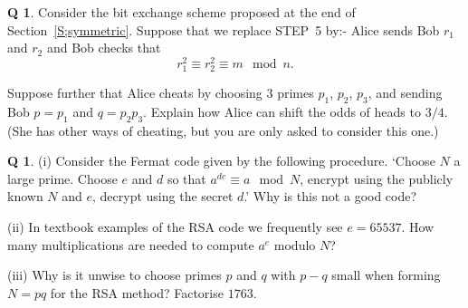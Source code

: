 \documentclass[12pt,a4paper]{article}
\theoremstyle{plain}
\theoremstyle{definition}
\newtheorem{question}[theorem]{Q}
\begin{document}
    \begin{question}
        \label{Q;Alice cheats}\label{C4.12}
        Consider the bit exchange scheme
        proposed at the end of Section~\ref{S;symmetric}.
        Suppose that we replace STEP~5 by:- Alice sends Bob
        $r_{1}$ and $r_{2}$ and Bob checks that
        \[r_{1}^{2}\equiv r_{2}^{2}\equiv m\mod{n}.\]

        Suppose further that Alice cheats by
        choosing $3$ primes $p_{1}$, $p_{2}$, $p_{3}$,
        and sending Bob $p=p_{1}$ and $q=p_{2}p_{3}$.
        Explain how Alice can shift the odds of heads
        to $3/4$. (She has other ways of cheating, but
        you are only asked to consider this one.)
    \end{question}
    \begin{question}
        \label{C4.13}
        (i) Consider the Fermat code
        given by the following procedure.
        `Choose $N$ a large prime. Choose $e$ and $d$ so that
        $a^{de}\equiv a \mod{N}$, encrypt using the publicly known
        $N$ and $e$, decrypt using the secret $d$.'
        Why is this not a good code?

        (ii) In textbook examples of the RSA code we frequently see
        $e=65537$. How many multiplications
        are needed to
        compute $a^{e}$ modulo $N$?

        (iii) Why is it unwise to choose primes $p$ and $q$
        with $p-q$ small when forming $N=pq$ for the RSA method?
        Factorise $1763$.
    \end{question}
\end{document}
